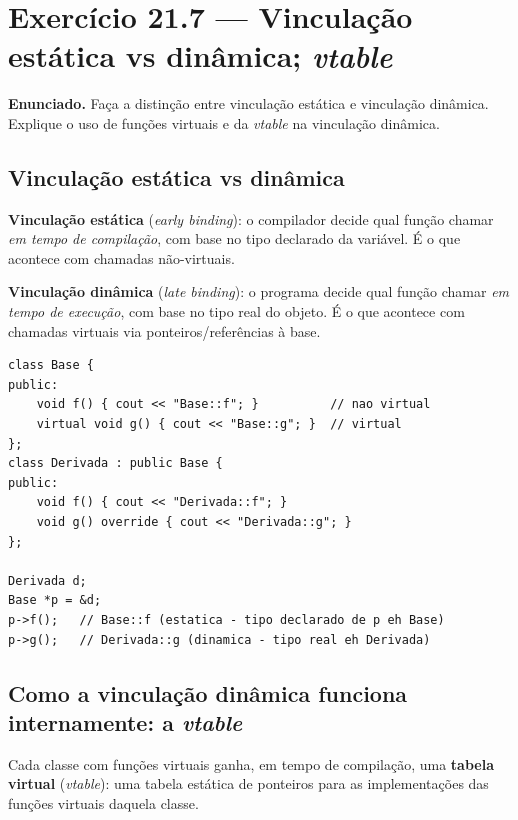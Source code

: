 \documentclass[11pt,a4paper]{article}
\begin{document}
\section{Exerc\'icio 21.7 --- Vincula\c{c}\~ao est\'atica vs din\^amica; \emph{vtable}}

\begin{enunciado}
\textbf{Enunciado.} Fa\c{c}a a distin\c{c}\~ao entre vincula\c{c}\~ao est\'atica e vincula\c{c}\~ao din\^amica. Explique o uso de fun\c{c}\~oes virtuais e da \emph{vtable} na vincula\c{c}\~ao din\^amica.
\end{enunciado}

\subsection*{Vincula\c{c}\~ao est\'atica vs din\^amica}

\textbf{Vincula\c{c}\~ao est\'atica} (\emph{early binding}): o compilador decide qual fun\c{c}\~ao chamar \emph{em tempo de compila\c{c}\~ao}, com base no tipo declarado da vari\'avel. \'E o que acontece com chamadas n\~ao-virtuais.

\textbf{Vincula\c{c}\~ao din\^amica} (\emph{late binding}): o programa decide qual fun\c{c}\~ao chamar \emph{em tempo de execu\c{c}\~ao}, com base no tipo real do objeto. \'E o que acontece com chamadas virtuais via ponteiros/refer\^encias \`a base.

\begin{lstlisting}[style=cppcode,numbers=none]
class Base {
public:
    void f() { cout << "Base::f"; }          // nao virtual
    virtual void g() { cout << "Base::g"; }  // virtual
};
class Derivada : public Base {
public:
    void f() { cout << "Derivada::f"; }
    void g() override { cout << "Derivada::g"; }
};

Derivada d;
Base *p = &d;
p->f();   // Base::f (estatica - tipo declarado de p eh Base)
p->g();   // Derivada::g (dinamica - tipo real eh Derivada)
\end{lstlisting}

\subsection*{Como a vincula\c{c}\~ao din\^amica funciona internamente: a \emph{vtable}}

Cada classe com fun\c{c}\~oes virtuais ganha, em tempo de compila\c{c}\~ao, uma \textbf{tabela virtual} (\emph{vtable}): uma tabela est\'atica de ponteiros para as implementa\c{c}\~oes das fun\c{c}\~oes virtuais daquela classe.
\end{document}
